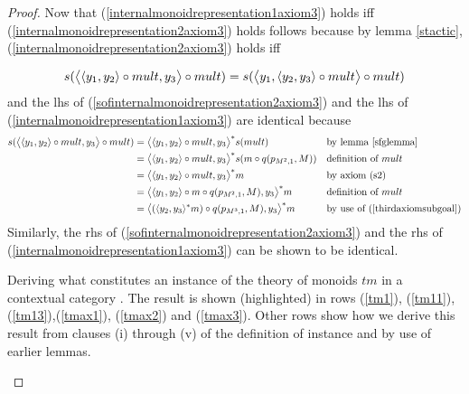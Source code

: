 \begin{proof}
Now that (\ref{internalmonoidrepresentation1axiom3}) holds iff (\ref{internalmonoidrepresentation2axiom3}) holds
follows because by lemma \ref{stactic}, (\ref{internalmonoidrepresentation2axiom3}) holds iff

\begin{equation}
\label{sofinternalmonoidrepresentation2axiom3}
s(\big \langle \langle y_1,y_2\rangle\circ mult,y_3 \big \rangle\circ mult)
=s(\big \langle y_1,\langle y_2,y_3\rangle \circ mult \big \rangle\circ mult)
\end{equation}
and the lhs of (\ref{sofinternalmonoidrepresentation2axiom3}) and the lhs of (\ref{internalmonoidrepresentation1axiom3}) 
are identical because
\begin{align*}
s(\big \langle \langle y_1,y_2\rangle\circ mult,y_3 \big \rangle\circ mult) 
    &= \big \langle \langle y_1,y_2\rangle\circ mult,y_3 \big \rangle ^* s(mult) && \mbox{by lemma \ref{sfglemma}} \\
		&= \big \langle \langle y_1,y_2\rangle\circ mult,y_3 \big \rangle ^* s(m \circ q(p_{M^2,1} , M)) && \mbox{definition of $mult$} \\
		&= \big \langle \langle y_1,y_2\rangle\circ mult,y_3 \big \rangle ^* m                                &&  \mbox{by axiom (s2)} \\
		&= \big \langle \langle y_1,y_2\rangle\circ m \circ q(p_{M^2,1} , M),y_3 \big \rangle ^* m  
		                                                                    &&  \mbox{definition of $mult$} \\	
	  &= \big \langle (\langle y_2,y_3\rangle^*m)\circ q(p_{M^3,1},M),y_3 \big \rangle ^* m 
		                                                                    &&  \mbox{by use of (\ref{thirdaxiomsubgoal})}
\end{align*}
Similarly, the rhs of (\ref{sofinternalmonoidrepresentation2axiom3}) and the rhs of (\ref{internalmonoidrepresentation1axiom3}) 
can be shown to be identical.

\begin{table}[H]
\caption{Deriving what constitutes an instance of the theory of monoids $tm$ in a contextual category \catc.
The result is shown (highlighted) in rows (\ref{tm1}), (\ref{tm11}), (\ref{tm13}),(\ref{tmax1}), (\ref{tmax2}) and (\ref{tmax3}). Other rows 
show how we derive this result from clauses (i) through (v) of the definition of instance and by use of earlier lemmas.}
\label{internalmonoidtable}


\end{table}
\end{proof}
